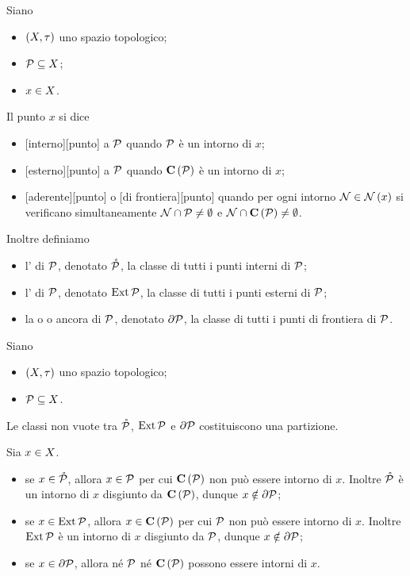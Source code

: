 \begin{Definition}
	Siano
	\begin{itemize}
		\item $(X,\tau)$ uno spazio
		 topologico;
		\item $\mathcal{P} \subseteq X$;
		\item $x \in X$.
	\end{itemize}
	Il punto $x$ si dice
	\begin{itemize}
		\item {}[interno][punto] a $\mathcal{P}$ quando
		$\mathcal{P}$ \`e un intorno di $x$;
		\item {}[esterno][punto] a $\mathcal{P}$ quando
		$\mathbf{C} \left ( \mathcal{P} \right )$ \`e un intorno di $x$;
		\item {}[aderente][punto] o
		[di frontiera][punto] quando
		per ogni intorno $\Neighborhood \in \Neighborhoods{x}$ si verificano
		simultaneamente $\mathcal{N} \cap \mathcal{P} \neq \emptyset$
		e $\mathcal{N} \cap \mathbf{C} \left ( \mathcal{P} \right ) \neq \emptyset$.
	\end{itemize}
	Inoltre definiamo
	\begin{itemize}
		\item l' di $\mathcal{P}$, denotato
		 $\mathring{\mathcal{P}}$, la classe di tutti i punti interni
		 di $\mathcal{P}$;
		\item l' di $\mathcal{P}$, denotato
		 $\operatorname{Ext}{\mathcal{P}}$, la classe di tutti i punti esterni
		 di $\mathcal{P}$;
		\item la  o  o ancora
		 di $\mathcal{P}$, denotato
		$\partial{\mathcal{P}}$, la classe di tutti i punti di
		 frontiera di $\mathcal{P}$.
	\end{itemize}
\end{Definition}
\begin{Theorem}
	Siano
	\begin{itemize}
		\item $(X,\tau)$ uno spazio
		 topologico;
		\item $\mathcal{P} \subseteq X$.
	\end{itemize}
	Le classi non vuote tra $\mathring{\mathcal{P}}$, $\operatorname{Ext}{\mathcal{P}}$ e
	$\partial{\mathcal{P}}$ costituiscono una partizione.
\end{Theorem}
\Proof Sia $x \in X$.
\begin{itemize}
	\item se $x \in \mathring{\mathcal{P}}$, allora $x \in \mathcal{P}$ per cui
	$\mathbf{C} \left ( \mathcal{P} \right )$ non pu\`o essere intorno di $x$. Inoltre
	$\mathring{\mathcal{P}}$ \`e un intorno di $x$ disgiunto da
	$\mathbf{C} \left ( \mathcal{P} \right )$, dunque $x \notin \partial{\mathcal{P}}$;
	\item se $x \in \operatorname{Ext}{\mathcal{P}}$, allora
	 $x \in \mathbf{C} \left ( \mathcal{P} \right )$ per cui
	$\mathcal{P}$ non pu\`o essere intorno di $x$. Inoltre
	$\operatorname{Ext}{\mathcal{P}}$ \`e un intorno di $x$ disgiunto da
	$\mathcal{P}$, dunque $x \notin \partial{\mathcal{P}}$;
	\item se $x \in \partial{\mathcal{P}}$, allora n\'e $\mathcal{P}$ n\'e
	 $\mathbf{C} \left ( \mathcal{P} \right )$ possono essere intorni di $x$. \EndProof
\end{itemize}
